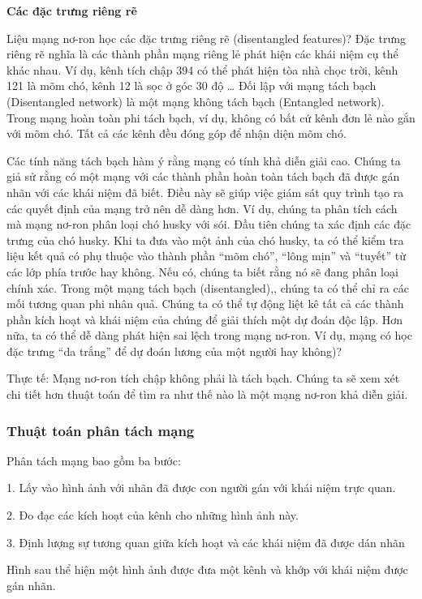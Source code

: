 \textbf{Các đặc trưng riêng rẽ}

Liệu mạng nơ-ron học các đặc trưng riêng rẽ (disentangled features)? Đặc trưng riêng rẽ nghĩa là các thành phần mạng riêng lẻ phát hiện các khái niệm cụ thể khác nhau. Ví dụ, kênh tích chập 394 có thể phát hiện tòa nhà chọc trời, kênh 121 là mõm chó, kênh 12 là sọc ở góc 30 độ … Đối lập với mạng tách bạch (Disentangled network) là một mạng không tách bạch (Entangled network). Trong mạng hoàn toàn phi tách bạch, ví dụ, không có bất cứ kênh đơn lẻ nào gắn với mõm chó. Tất cả các kênh đều đóng góp để nhận diện mõm chó.

Các tính năng tách bạch hàm ý rằng mạng có tính khả diễn giải cao. Chúng ta giả sử rằng có một mạng với các thành phần hoàn toàn tách bạch đã được gán nhãn với các khái niệm đã biết. Điều này sẽ giúp việc giám sát quy trình tạo ra các quyết định của mạng trở nên dễ dàng hơn. Ví dụ, chúng ta phân tích cách mà mạng nơ-ron phân loại chó husky với sói. Đầu tiên chúng ta xác định các đặc trưng của chó husky. Khi ta đưa vào một ảnh của chó husky, ta có thể kiểm tra liệu kết quả có phụ thuộc vào thành phần ``mõm chó'', ``lông mịn'' và ``tuyết'' từ các lớp phía trước hay không. Nếu có, chúng ta biết rằng nó sẽ đang phân loại chính xác. Trong một mạng tách bạch (disentangled),, chúng ta có thể chỉ ra các mối tương quan phi nhân quả. Chúng ta có thể tự động liệt kê tất cả các thành phần kích hoạt và khái niệm của chúng để giải thích một dự đoán độc lập. Hơn nữa, ta có thể dễ dàng phát hiện sai lệch trong mạng nơ-ron. Ví dụ, mạng có học đặc trưng “da trắng” để dự đoán lương của một người hay không)?

Thực tế: Mạng nơ-ron tích chập không phải là tách bạch. Chúng ta sẽ xem xét chi tiết hơn thuật toán để tìm ra như thế nào là một mạng nơ-ron khả diễn giải.

\subsubsection{Thuật toán phân tách mạng}

Phân tách mạng bao gồm ba bước:

1. Lấy vào hình ảnh với nhãn đã được con người gán với khái niệm trực quan.

2. Đo đạc các kích hoạt của kênh cho những hình ảnh này.

3. Định lượng sự tương quan giữa kích hoạt và các khái niệm đã được dán nhãn

Hình sau thể hiện một hình ảnh được đưa một kênh và khớp với khái niệm được gán nhãn.

